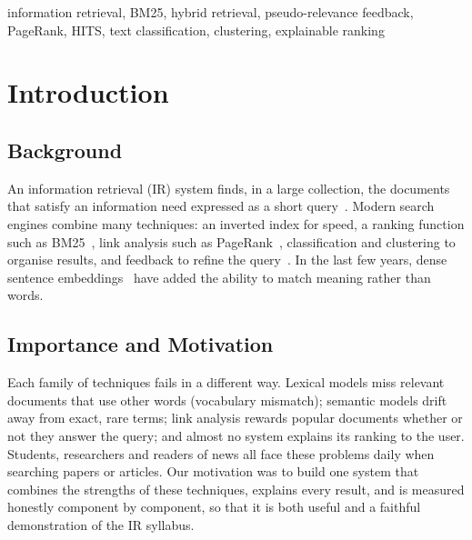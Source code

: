 \documentclass[conference]{IEEEtran}
\begin{document}
\begin{IEEEkeywords}
information retrieval, BM25, hybrid retrieval, pseudo-relevance feedback, PageRank, HITS, text classification, clustering, explainable ranking
\end{IEEEkeywords}

\section{Introduction}
\subsection{Background}
An information retrieval (IR) system finds, in a large collection, the documents that satisfy an information need expressed as a short query~\cite{manning2008}. Modern search engines combine many techniques: an inverted index for speed, a ranking function such as BM25~\cite{robertson2009}, link analysis such as PageRank~\cite{brin1998}, classification and clustering to organise results, and feedback to refine the query~\cite{rocchio1971}. In the last few years, dense sentence embeddings~\cite{reimers2019} have added the ability to match meaning rather than words.

\subsection{Importance and Motivation}
Each family of techniques fails in a different way. Lexical models miss relevant documents that use other words (vocabulary mismatch); semantic models drift away from exact, rare terms; link analysis rewards popular documents whether or not they answer the query; and almost no system explains its ranking to the user. Students, researchers and readers of news all face these problems daily when searching papers or articles. Our motivation was to build one system that combines the strengths of these techniques, explains every result, and is measured honestly component by component, so that it is both useful and a faithful demonstration of the IR syllabus.
\end{document}

